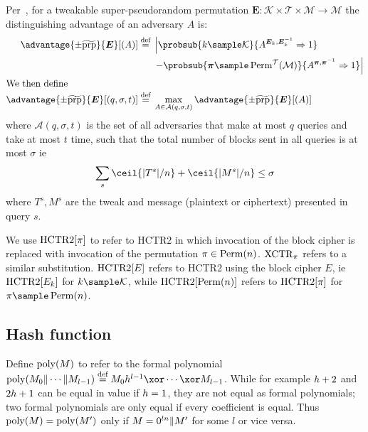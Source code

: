 \documentclass[hctr2.tex]{subfiles}
\begin{document}
Per~\cite{cmc}, for a tweakable super-pseudorandom permutation
$\bm{E} : \mathcal{K} \times \mathcal{T} \times \mathcal{M} \rightarrow \mathcal{M}$
the distinguishing advantage of an adversary $A$ is:
%
\begin{align*}
    \advantage{\pm \widetilde{\mathrm{prp}}}{\bm{E}}[(A)] \defeq
    {}&\left\lvert\probsub{k \sample \mathcal{K}}{A^{\bm{E}_k,\bm{E}_k^{-1}}\Rightarrow 1}\right.
    \\
    {}&\left. - \probsub{\bm{\pi} \sample \Perm^\mathcal{T}(\mathcal{M})}
        {A^{\bm{\pi},\bm{\pi}^{-1}}\Rightarrow 1}\right\rvert
    \\
    \intertext{We then define}
    \advantage{\pm \widetilde{\mathrm{prp}}}{\bm{E}}[(q, \sigma, t)]
    \defeq {}&
    \max_{A \in \mathcal{A}(q, \sigma, t)} \advantage{\pm \widetilde{\mathrm{prp}}}{\bm{E}}[(A)]
\end{align*}
where \(\mathcal{A}(q, \sigma, t)\)
is the set of all adversaries 
that make at most \(q\) queries
and take at most \(t\) time,
such that the total number of blocks sent in all queries is
at most \(\sigma\) ie
\begin{displaymath}
    \sum_s \ceil{|T^s|/n} + \ceil{|M^s|/n} \leq \sigma
\end{displaymath}
where \(T^s, M^s\) are the tweak and message
(plaintext or ciphertext)
presented in query \(s\).

We use \(\operatorname{HCTR2}[\pi]\) to refer to HCTR2 in which invocation
of the block cipher is replaced with invocation of the
permutation \(\pi \in \operatorname{Perm}(n)\).
\(\operatorname{XCTR}_\pi\) refers to a similar substitution.
\(\operatorname{HCTR2}[E]\) refers to HCTR2 using the block cipher \(E\),
ie \(\operatorname{HCTR2}[E_k]\) for \(k \sample \mathcal{K}\), while
\(\operatorname{HCTR2}[\operatorname{Perm}(n)]\) refers to \(\operatorname{HCTR2}[\pi]\)
for \(\pi \sample \Perm(n)\).

\subsection{Hash function}\label{hproperties}

Define \(\operatorname{poly}(M)\) to refer to the formal polynomial
\(\poly(M_0 \Concat \cdots \Concat M_{l-1})
\defeq  M_0\hpoly^{l-1} \xor \cdots \xor M_{l-1}\).
While for example \(h + 2\) and \(2h + 1\) can be equal
in value if \(h = 1\),
they are not equal as formal polynomials;
two formal polynomials are only equal
if every coefficient is equal. Thus \(\operatorname{poly}(M) = \operatorname{poly}(M')\)
only if \(M = 0^{ln} \Vert M'\) for some \(l\) or vice versa.
\end{document}
